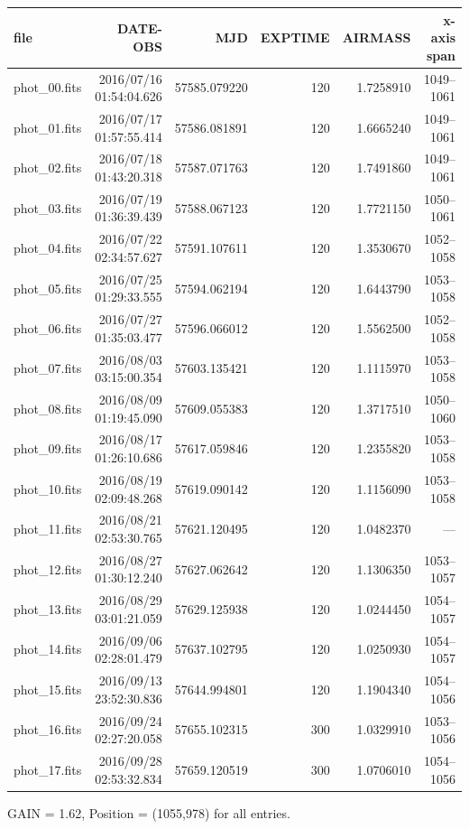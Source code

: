 \documentclass{article}
\begin{document}
\begin{enumerate}
		\begin{table} [h] 
			\centering
			\begin{tabular}[width=\linewidth] {l r r r r r}
				\toprule
				\textbf{file} & \textbf{DATE-OBS} & \textbf{MJD} & \textbf{EXPTIME} & \textbf{AIRMASS} & \textbf{x-axis span} \\
				\midrule
				phot\_00.fits & 2016/07/16 01:54:04.626 & 57585.079220 & 120 & 1.7258910 & 1049--1061 \\
				phot\_01.fits & 2016/07/17 01:57:55.414 & 57586.081891 & 120 & 1.6665240 & 1049--1061 \\
				phot\_02.fits & 2016/07/18 01:43:20.318 & 57587.071763 & 120 & 1.7491860 & 1049--1061 \\
				phot\_03.fits & 2016/07/19 01:36:39.439 & 57588.067123 & 120 & 1.7721150 & 1050--1061 \\
				phot\_04.fits & 2016/07/22 02:34:57.627 & 57591.107611 & 120 & 1.3530670 & 1052--1058 \\
				phot\_05.fits & 2016/07/25 01:29:33.555 & 57594.062194 & 120 & 1.6443790 & 1053--1058 \\
				phot\_06.fits & 2016/07/27 01:35:03.477 & 57596.066012 & 120 & 1.5562500 & 1052--1058 \\
				phot\_07.fits & 2016/08/03 03:15:00.354 & 57603.135421 & 120 & 1.1115970 & 1053--1058 \\
				phot\_08.fits & 2016/08/09 01:19:45.090 & 57609.055383 & 120 & 1.3717510 & 1050--1060 \\
				phot\_09.fits & 2016/08/17 01:26:10.686 & 57617.059846 & 120 & 1.2355820 & 1053--1058 \\
				phot\_10.fits & 2016/08/19 02:09:48.268 & 57619.090142 & 120 & 1.1156090 & 1053--1058 \\
				phot\_11.fits & 2016/08/21 02:53:30.765 & 57621.120495 & 120 & 1.0482370 & --- \\
				phot\_12.fits & 2016/08/27 01:30:12.240 & 57627.062642 & 120 & 1.1306350 & 1053--1057 \\
				phot\_13.fits & 2016/08/29 03:01:21.059 & 57629.125938 & 120 & 1.0244450 & 1054--1057 \\
				phot\_14.fits & 2016/09/06 02:28:01.479 & 57637.102795 & 120 & 1.0250930 & 1054--1057 \\
				phot\_15.fits & 2016/09/13 23:52:30.836 & 57644.994801 & 120 & 1.1904340 & 1054--1056 \\
				phot\_16.fits & 2016/09/24 02:27:20.058 & 57655.102315 & 300 & 1.0329910 & 1053--1056 \\
				phot\_17.fits & 2016/09/28 02:53:32.834 & 57659.120519 & 300 & 1.0706010 & 1054--1056 \\
				\bottomrule
			\end{tabular}
		\end{table}
		GAIN = 1.62, Position = (1055,978) for all entries. 
		

\end{enumerate}
\end{document}

